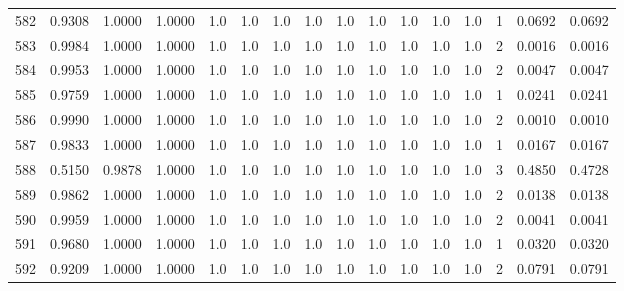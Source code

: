 \begin{tabular}{lrrrrrrrrrrrrrrr}
582 &      0.9308 &  1.0000 &  1.0000 &     1.0 &     1.0 &     1.0 &     1.0 &     1.0 &     1.0 &     1.0 &      1.0 &        1.0 &      1 &                    0.0692 &                     0.0692 \\
583 &      0.9984 &  1.0000 &  1.0000 &     1.0 &     1.0 &     1.0 &     1.0 &     1.0 &     1.0 &     1.0 &      1.0 &        1.0 &      2 &                    0.0016 &                     0.0016 \\
584 &      0.9953 &  1.0000 &  1.0000 &     1.0 &     1.0 &     1.0 &     1.0 &     1.0 &     1.0 &     1.0 &      1.0 &        1.0 &      2 &                    0.0047 &                     0.0047 \\
585 &      0.9759 &  1.0000 &  1.0000 &     1.0 &     1.0 &     1.0 &     1.0 &     1.0 &     1.0 &     1.0 &      1.0 &        1.0 &      1 &                    0.0241 &                     0.0241 \\
586 &      0.9990 &  1.0000 &  1.0000 &     1.0 &     1.0 &     1.0 &     1.0 &     1.0 &     1.0 &     1.0 &      1.0 &        1.0 &      2 &                    0.0010 &                     0.0010 \\
587 &      0.9833 &  1.0000 &  1.0000 &     1.0 &     1.0 &     1.0 &     1.0 &     1.0 &     1.0 &     1.0 &      1.0 &        1.0 &      1 &                    0.0167 &                     0.0167 \\
588 &      0.5150 &  0.9878 &  1.0000 &     1.0 &     1.0 &     1.0 &     1.0 &     1.0 &     1.0 &     1.0 &      1.0 &        1.0 &      3 &                    0.4850 &                     0.4728 \\
589 &      0.9862 &  1.0000 &  1.0000 &     1.0 &     1.0 &     1.0 &     1.0 &     1.0 &     1.0 &     1.0 &      1.0 &        1.0 &      2 &                    0.0138 &                     0.0138 \\
590 &      0.9959 &  1.0000 &  1.0000 &     1.0 &     1.0 &     1.0 &     1.0 &     1.0 &     1.0 &     1.0 &      1.0 &        1.0 &      2 &                    0.0041 &                     0.0041 \\
591 &      0.9680 &  1.0000 &  1.0000 &     1.0 &     1.0 &     1.0 &     1.0 &     1.0 &     1.0 &     1.0 &      1.0 &        1.0 &      1 &                    0.0320 &                     0.0320 \\
592 &      0.9209 &  1.0000 &  1.0000 &     1.0 &     1.0 &     1.0 &     1.0 &     1.0 &     1.0 &     1.0 &      1.0 &        1.0 &      2 &                    0.0791 &                     0.0791 \\

\end{tabular}
